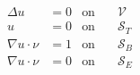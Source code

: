 \begin{align*} \Delta u &= 0 & \textrm{on} \quad & \mathcal V\\ u &= 0 & \textrm{on} \quad & \mathcal S_T\\ \nabla u \cdot \nu &= 1 & \textrm{on} \quad & \mathcal S_B\\ \nabla u \cdot \nu &= 0 & \textrm{on} \quad & \mathcal S_E\\ \end{align*}
